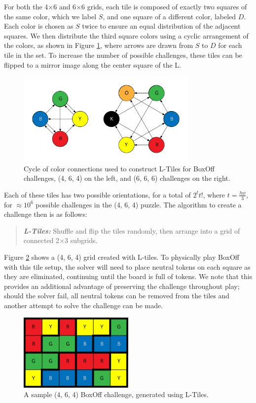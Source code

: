 \documentclass[journal]{IEEEtran}
\begin{document}
For both the 4$\times$6 and 6$\times$6 grids, each tile is composed of exactly two squares of the same color, which we label $S$, and one square of a different color, labeled $D$. Each color is chosen as $S$ twice to ensure an equal distribution of the adjacent squares. We then distribute the third square colors using a cyclic arrangement of the colors, as shown in Figure \ref{fig:boxoffcycle}, where arrows are drawn from $S$ to $D$ for each tile in the set.  To increase the number of possible challenges, these tiles can be flipped to a mirror image along the center square of the L.

\begin{figure}[t]
\centering
\includegraphics[width=8.8cm]{figure5.png}
\caption{Cycle of color connections used to construct L-Tiles for BoxOff challenges, (4, 6, 4) on the left, and (6, 6, 6) challenges on the right.}
\label{fig:boxoffcycle}
\end{figure}

Each of these tiles has two possible orientations, for a total of $2^{t}t!$, where $t=\frac{hw}{3}$, for $\approx 10^{6}$ possible challenges in the (4, 6, 4) puzzle. 
The algorithm to create a challenge then is as follows:

\begin{quote}
    {\it \bf L-Tiles:} Shuffle and flip the tiles randomly, then arrange into a grid of connected 2$\times$3 subgrids. 
\end{quote}

Figure \ref{fig:boxofftiles} shows a (4, 6, 4) grid created with L-tiles. To physically play BoxOff with this tile setup, the solver will need to place neutral tokens on each square as they are eliminated, continuing until the board is full of tokens. We note that this provides an additional advantage of preserving the challenge throughout play; should the solver fail, all neutral tokens can be removed from the tiles and another attempt to solve the challenge can be made.

\begin{figure}[t]
\centering
\includegraphics[width=5.6cm]{figure6.png}
\caption{A sample (4, 6, 4) BoxOff challenge, generated using L-Tiles. }
\label{fig:boxofftiles}
\end{figure}
\end{document}
